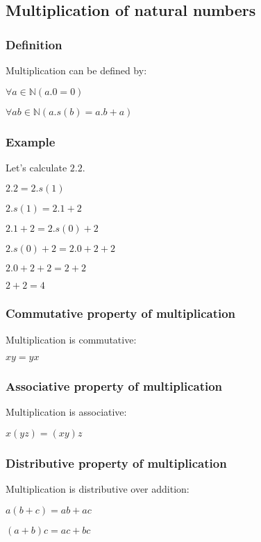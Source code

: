 \subsection{Multiplication of natural numbers}


\subsubsection{Definition}

Multiplication can be defined by:

$\forall a \in \mathbb{N} (a.0=0)$

$\forall a b \in \mathbb{N} (a.s(b)=a.b+a)$

\subsubsection{Example}

Let’s calculate \(2.2\).

$2.2=2.s(1)$

$2.s(1)=2.1+2$

$2.1+2=2.s(0)+2$

$2.s(0)+2=2.0+2+2$

$2.0+2+2=2+2$

$2+2=4$
\subsubsection{Commutative property of multiplication}

Multiplication is commutative:

$xy=yx$

\subsubsection{Associative property of multiplication}

Multiplication is associative:

$x(yz)=(xy)z$
\subsubsection{Distributive property of multiplication}

Multiplication is distributive over addition:

$a(b+c)=ab+ac$

$(a+b)c=ac+bc$



